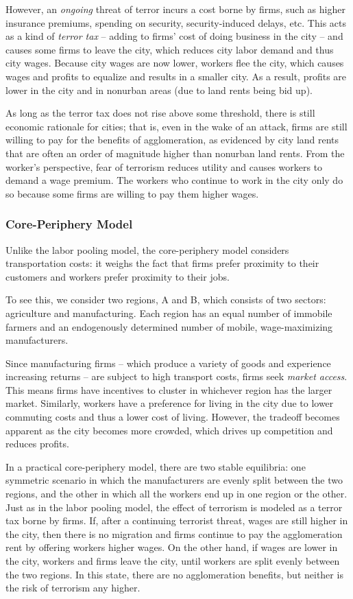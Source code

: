 \documentclass[preprint,2p,12pt]{elsarticle}
\begin{document}
However, an \emph{ongoing} threat of terror incurs a cost borne by firms, such as higher insurance premiums, spending on security, security-induced delays, etc.
This acts as a kind of \emph{terror tax} -- adding to firms' cost of doing business in the city -- and causes some firms to leave the city, which reduces city labor demand and thus city wages.
Because city wages are now lower, workers flee the city, which causes wages and profits to equalize and results in a smaller city.
As a result, profits are lower in the city and in nonurban areas (due to land rents being bid up). 

As long as the terror tax does not rise above some threshold, there is still economic rationale for cities; that is, even in the wake of an attack, firms are still willing to pay for the benefits of agglomeration, as evidenced by city land rents that are often an order of magnitude higher than nonurban land rents.
From the worker's perspective, fear of terrorism reduces utility and causes workers to demand a wage premium.
The workers who continue to work in the city only do so because some firms are willing to pay them higher wages.

\subsubsection{Core-Periphery Model}
Unlike the labor pooling model, the core-periphery model considers transportation costs: it weighs the fact that firms prefer proximity to their customers and workers prefer proximity to their jobs. 

To see this, we consider two regions, A and B, which consists of two sectors: agriculture and manufacturing. 
Each region has an equal number of immobile farmers and an endogenously determined number of mobile, wage-maximizing manufacturers.

Since manufacturing firms -- which produce a variety of goods and experience increasing returns -- are subject to high transport costs, firms seek \emph{market access}.
This means firms have incentives to cluster in whichever region has the larger market. 
Similarly, workers have a preference for living in the city due to lower commuting costs and thus a lower cost of living.
However, the tradeoff becomes apparent as the city becomes more crowded, which drives up competition and reduces profits.

In a practical core-periphery model, there are two stable equilibria: one symmetric scenario in which the manufacturers are evenly split between the two regions, and the other in which all the workers end up in one region or the other.
Just as in the labor pooling model, the effect of terrorism is modeled as a terror tax borne by firms.
If, after a continuing terrorist threat, wages are still higher in the city, then there is no migration and firms continue to pay the agglomeration rent by offering workers higher wages.
On the other hand, if wages are lower in the city, workers and firms leave the city, until workers are split evenly between the two regions.
In this state, there are no agglomeration benefits, but neither is the risk of terrorism any higher.
\end{document}
